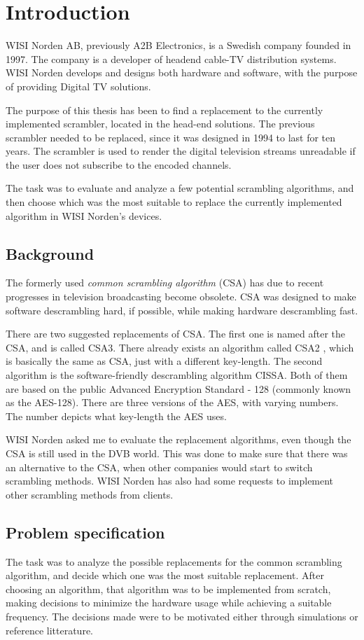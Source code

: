 \chapter{Introduction}
WISI Norden AB, previously A2B Electronics, is a Swedish company 
founded in 1997. The company is a developer of headend cable-TV 
distribution systems. WISI Norden develops and designs both hardware and
software, with the purpose of providing Digital TV solutions. 

The purpose of this thesis has been to find a replacement to the 
currently implemented scrambler, located in the head-end solutions. The 
previous scrambler needed to be replaced, since it was designed in 
1994 to last for ten years. The scrambler is used to render the 
digital television streams unreadable if the user does not subscribe to 
the encoded channels.

The task was to evaluate and analyze a few potential scrambling 
algorithms, and then choose which was the most suitable to replace the 
currently implemented algorithm in WISI Norden's devices.

\section{Background}
The formerly used \emph{common scrambling algorithm} (CSA) has due to 
recent progresses in television broadcasting become obsolete. CSA was 
designed to make software descrambling hard, if possible, while making 
hardware descrambling fast. 

There are two suggested replacements of CSA. The first one is named 
after the CSA, and is called CSA3. There already exists an algorithm 
called CSA2 , which is basically the same as CSA, just with a different 
key-length. The second algorithm is the software-friendly descrambling 
algorithm CISSA. Both of them are based on the public Advanced 
Encryption Standard - 128 (commonly known as the AES-128). There are 
three versions of the AES, with varying numbers. The number depicts 
what key-length the AES uses.

WISI Norden asked me to evaluate the replacement algorithms, even 
though the CSA is still used in the DVB world. This was done to make 
sure that there was an alternative to the CSA, when other companies 
would start to switch scrambling methods. WISI Norden has also had some 
requests to implement other scrambling methods from clients.

\section{Problem specification}
The task was to analyze the possible replacements for the common 
scrambling algorithm, and decide which one was the most suitable 
replacement. After choosing an algorithm, that algorithm was to be 
implemented from scratch, making decisions to minimize the hardware 
usage while achieving a suitable frequency. The decisions made were to 
be motivated either through simulations or reference litterature.

